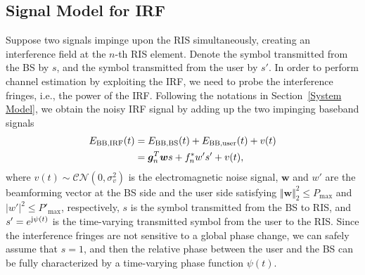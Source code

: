 \documentclass[conference,10pt,twocolumn]{IEEEtran}
\theoremstyle{nonumberplain}
\begin{document}

\subsection{Signal Model for IRF}
\label{Models for IRFs}
    Suppose two signals impinge upon the RIS simultaneously, creating an interference field at the $n$-th RIS element. Denote the symbol transmitted from the \ac{BS} by $s$, and the symbol transmitted from the user by $s'$. In order to perform channel estimation by exploiting the \ac{IRF}, we need to probe the interference fringes, i.e., the power of the \ac{IRF}. Following the notations in Section~\ref{System Model}, we obtain the noisy IRF signal by adding up the two impinging baseband signals
    \begin{equation}
        \begin{aligned}
            E_{{\rm BB, IRF}}(t) &= E_{{\rm BB, BS}}(t)+E_{{\rm BB,user}}(t)+v(t)\\
            &=\bm g_{n}^{T}\bm w s+f_{n}^{*} w' s' +v(t),
        \end{aligned}
    \end{equation}
    where $v(t)\sim \mathcal{CN}(0,\sigma_{v}^{2})$ is the electromagnetic noise signal, $\bm w$ and $w'$ are the beamforming vector at the BS side and the user side satisfying $\Vert \bm w \Vert_{2}^{2}\leq P_{\text{max}}$ and $|w'|^{2}\leq P'_{\text{max}}$, respectively,
    $s$ is the symbol transmitted from the BS to RIS, and $s'=e^{{\rm j} \psi(t)}$ is the time-varying transmitted symbol from the user to the RIS.  
    Since the interference fringes are not sensitive to a global phase change, we can safely assume that $s=1$, and then the relative phase between the user and the BS can be fully characterized by a time-varying phase function $\psi(t)$.  
\end{document}
